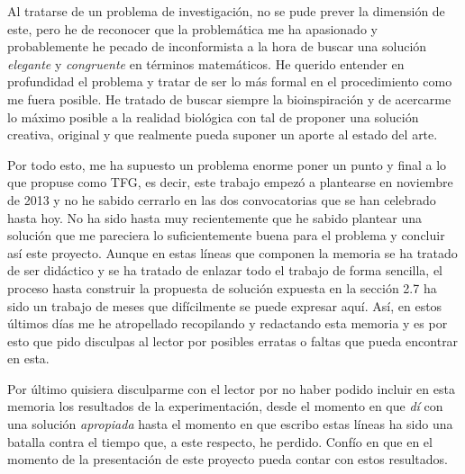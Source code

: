 \documentclass[10pt,a4paper]{report}
\begin{document}
Al tratarse de un problema de investigación, no se pude prever la dimensión de este, pero he de reconocer que la problemática me ha apasionado y probablemente he pecado de inconformista a la hora de buscar una solución \textit{elegante} y \textit{congruente} en términos matemáticos. He querido entender en profundidad el problema y tratar de ser lo más formal en el procedimiento como me fuera posible. He tratado de buscar siempre la bioinspiración y de acercarme lo máximo posible a la realidad biológica con tal de proponer una solución creativa, original y que realmente pueda suponer un aporte al estado del arte.

Por todo esto, me ha supuesto un problema enorme poner un punto y final a lo que propuse como TFG, es decir, este trabajo empezó a plantearse en noviembre de 2013 y no he sabido cerrarlo en las dos convocatorias que se han celebrado hasta hoy. No ha sido hasta muy recientemente que he sabido plantear una solución que me pareciera lo suficientemente buena para el problema y concluir así este proyecto. Aunque en estas líneas que componen la memoria se ha tratado de ser didáctico y se ha tratado de enlazar todo el trabajo de forma sencilla, el proceso hasta construir la propuesta de solución expuesta en la sección 2.7 ha sido un trabajo de meses que difícilmente se puede expresar aquí. Así, en estos últimos días me he atropellado recopilando y redactando esta memoria y es por esto que pido disculpas al lector por posibles erratas o faltas que pueda encontrar en esta.

Por último quisiera disculparme con el lector por no haber podido incluir en esta memoria los resultados de la experimentación, desde el momento en que \textit{dí} con una solución \textit{apropiada} hasta el momento en que escribo estas líneas ha sido una batalla contra el tiempo que, a este respecto, he perdido. Confío en que en el momento de la presentación de este proyecto pueda contar con estos resultados.




\end{document}
